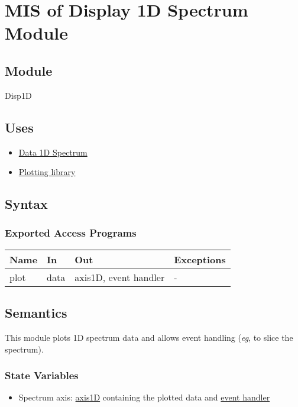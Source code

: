 \documentclass[12pt, titlepage]{article}
\begin{document}
\section{MIS of Display 1D Spectrum Module} \label{Mod:Disp1D}

\subsection{Module}

Disp1D

\subsection{Uses}
\begin{itemize}
    \item \hyperref[Mod:Spectrum]{Data 1D Spectrum}
    \item \hyperref[Mod:Plotting]{Plotting library}
\end{itemize}

\subsection{Syntax}

\subsubsection{Exported Access Programs}

\begin{center}
    \begin{tabular}{p{2cm} p{4cm} p{4cm} p{2cm}}
        \hline
        \textbf{Name} & \textbf{In} & \textbf{Out} & \textbf{Exceptions} \\
        \hline
        plot & data & axis1D, event handler & - \\
        \hline
    \end{tabular}
\end{center}

\subsection{Semantics}
This module plots 1D spectrum data and allows event handling (\textit{eg}, to
slice the spectrum).

\subsubsection{State Variables}
\begin{itemize}
    \item Spectrum axis: \hyperref[Mod:Plotting]{axis1D} containing the plotted
    data and \hyperref[Mod:Plotting]{event handler}
\end{itemize}
\end{document}
